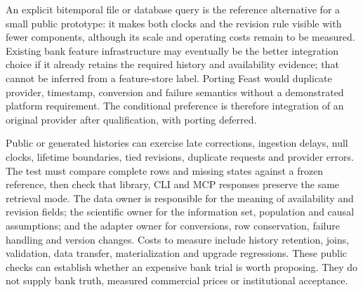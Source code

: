 An explicit bitemporal file or database query is the reference alternative
for a small public prototype: it makes both clocks and the revision rule
visible with fewer components, although its scale and operating costs remain
to be measured. Existing bank feature infrastructure may eventually be the
better integration choice if it already retains the required history and
availability evidence; that cannot be inferred from a feature-store label.
Porting Feast would duplicate provider, timestamp, conversion and failure
semantics without a demonstrated platform requirement. The conditional
preference is therefore integration of an original provider after
qualification, with porting deferred.

Public or generated histories can exercise late corrections, ingestion
delays, null clocks, lifetime boundaries, tied revisions, duplicate requests
and provider errors. The test must compare complete rows and missing states
against a frozen reference, then check that library, CLI and MCP responses
preserve the same retrieval mode. The data owner is responsible for the
meaning of availability and revision fields; the scientific owner for the
information set, population and causal assumptions; and the adapter owner
for conversions, row conservation, failure handling and version changes.
Costs to measure include history retention, joins, validation, data transfer,
materialization and upgrade regressions. These public checks can establish
whether an expensive bank trial is worth proposing. They do not supply bank
truth, measured commercial prices or institutional acceptance.
